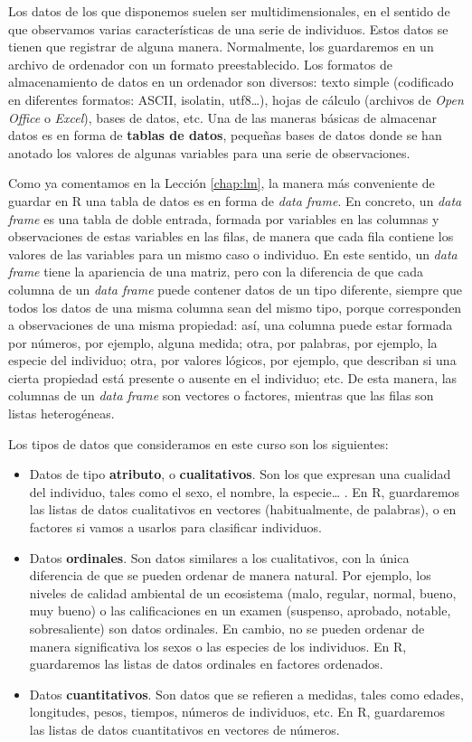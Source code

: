 \documentclass[
]{book}
\theoremstyle{definition}
\theoremstyle{definition}
\theoremstyle{definition}
\theoremstyle{remark}
\begin{document}
Los datos de los que disponemos suelen ser multidimensionales, en el sentido de que
observamos varias características de una serie de individuos. Estos datos
se tienen que registrar de alguna manera. Normalmente, los
guardaremos en un archivo de ordenador con un formato preestablecido.
Los formatos de almacenamiento de datos en un ordenador son diversos: texto
simple (codificado en diferentes formatos: ASCII, isolatin, utf8\ldots), hojas
de cálculo (archivos de \emph{Open Office} o \emph{Excel}), bases de datos, etc.
Una de las maneras básicas de almacenar datos es en forma de \textbf{tablas
de datos}, pequeñas bases de datos donde se han anotado los valores de algunas variables para una serie de observaciones.

Como ya comentamos en la Lección \ref{chap:lm}, la manera más conveniente de guardar en R una tabla de datos es en forma de \emph{data frame}. En concreto, un \emph{data frame} es una tabla de doble entrada, formada por variables en las columnas y observaciones de estas variables en las filas, de manera que cada fila contiene los valores de las variables para un mismo caso o individuo. En este sentido, un \emph{data frame} tiene la apariencia de una matriz, pero con la diferencia de que cada columna de un \emph{data frame} puede contener datos de un tipo diferente, siempre que todos los datos de una misma columna sean del mismo tipo, porque corresponden a observaciones
de una misma propiedad: así, una columna puede estar formada por números, por ejemplo, alguna medida; otra, por palabras, por ejemplo, la especie del individuo; otra, por valores lógicos, por ejemplo, que describan si una cierta propiedad está presente o ausente en el individuo; etc. De esta manera, las columnas de un \emph{data frame} son vectores o factores, mientras que las filas son listas heterogéneas.

Los tipos de datos que consideramos en este curso son los siguientes:

\begin{itemize}
\item
  Datos de tipo \textbf{atributo}, o \textbf{cualitativos}. Son los que expresan una cualidad del individuo, tales como el sexo, el nombre, la especie\ldots{} . En R, guardaremos las listas de datos cualitativos en vectores (habitualmente, de palabras), o en factores si vamos a usarlos para clasificar individuos.
\item
  Datos \textbf{ordinales}. Son datos similares a los cualitativos, con la única diferencia de que se pueden ordenar de manera natural. Por ejemplo, los niveles de calidad ambiental de un ecosistema (malo, regular, normal, bueno, muy bueno) o las calificaciones en un examen (suspenso, aprobado, notable, sobresaliente) son datos ordinales. En cambio, no se pueden ordenar de manera significativa los sexos o las especies de los individuos. En R, guardaremos las listas de datos ordinales en factores ordenados.
\item
  Datos \textbf{cuantitativos}. Son datos que se refieren a medidas, tales como edades, longitudes, pesos, tiempos, números de individuos, etc. En R, guardaremos las listas de datos cuantitativos en vectores de números.
\end{itemize}
\end{document}
